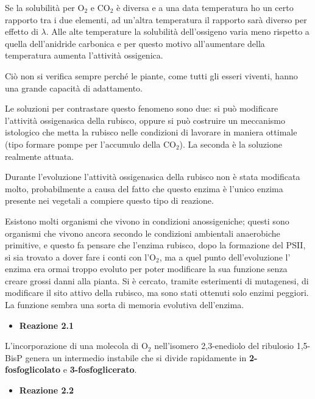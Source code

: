 \documentclass[]{article}
\begin{document}
Se la solubilità per O$_2$ e CO$_2$ è diversa e a una data temperatura
ho un certo rapporto tra i due elementi, ad un'altra temperatura il
rapporto sarà diverso per effetto di $\lambda$. Alle alte temperature la
solubilità dell'ossigeno varia meno rispetto a quella dell'anidride
carbonica e per questo motivo all'aumentare della temperatura aumenta
l'attività ossigenica.

Ciò non si verifica sempre perché le piante, come tutti gli esseri
viventi, hanno una grande capacità di adattamento.

Le soluzioni per contrastare questo fenomeno sono due: si può modificare
l'attività ossigenasica della rubisco, oppure si può costruire un
meccanismo istologico che metta la rubisco nelle condizioni di lavorare
in maniera ottimale (tipo formare pompe per l'accumulo della CO$_2$). La
seconda è la soluzione realmente attuata.

Durante l'evoluzione l'attività ossigenasica della rubisco non è stata
modificata molto, probabilmente a causa del fatto che questo enzima è
l'unico enzima presente nei vegetali a compiere questo tipo di reazione.

Esistono molti organismi che vivono in condizioni anossigeniche; questi
sono organismi che vivono ancora secondo le condizioni ambientali
anaerobiche primitive, e questo fa pensare che l'enzima rubisco, dopo la
formazione del PSII, si sia trovato a dover fare i conti con l'O$_2$, ma
a quel punto dell'evoluzione l' enzima era ormai troppo evoluto per
poter modificare la sua funzione senza creare grossi danni alla pianta.
Si è cercato, tramite esterimenti di mutagenesi, di modificare il sito
attivo della rubisco, ma sono stati ottenuti solo enzimi peggiori. La
funzione sembra una sorta di memoria evolutiva dell'enzima.

\begin{itemize}
\itemsep1pt\parskip0pt
\item
  \textbf{Reazione 2.1}
\end{itemize}

L'incorporazione di una molecola di O$_2$ nell'isomero 2,3-enediolo del
ribulosio 1,5-BisP genera un intermedio instabile che si divide
rapidamente in \textbf{2-fosfoglicolato} e \textbf{3-fosfoglicerato}.

\begin{itemize}
\itemsep1pt\parskip0pt
\item
  \textbf{Reazione 2.2}
\end{itemize}
\end{document}
